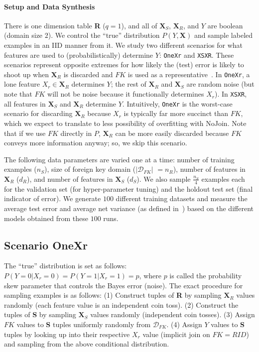 \documentclass{vldb}
\begin{document}
\paragraph*{Setup and Data Synthesis}
There is one dimension table \textbf{R} ($q=1$), and all of $\textbf{X}_S$, $\textbf{X}_R$, and $Y$ are boolean (domain size $2$).
We control the ``true'' distribution $P(Y,\textbf{X})$ and sample labeled examples in an IID manner from it.
We study two different scenarios for what features are used to (probabilistically) determine $Y$: \texttt{OneXr} and \texttt{XSXR}.
These scenarios represent opposite extremes for how likely the (test) error is likely to shoot up when $\textbf{X}_R$ is discarded
and $FK$ is used as a representative~\cite{hamlet}. In \texttt{OneXr}, a lone feature $X_r \in \textbf{X}_R$ determines $Y$; the 
rest of $\textbf{X}_R$ and $\textbf{X}_S$ are random noise (but note that $FK$ will not 
be noise because it functionally determines $X_r$). In \texttt{XSXR}, all features in $\textbf{X}_S$ and $\textbf{X}_R$ determine $Y$. 
Intuitively, \texttt{OneXr} is the worst-case scenario for discarding $\textbf{X}_R$ because $X_r$ is typically 
far more succinct than $FK$, which we expect to translate to less possibility of overfitting with NoJoin. Note that if we use $FK$ 
directly in $P$, $\textbf{X}_R$ can be more easily discarded because $FK$ conveys more information anyway; so, we skip this scenario.

The following data parameters are varied one at a time: number of training examples ($n_S$), size of foreign key domain ($|\mathcal{D}_{FK}|$ $=n_R$),
number of features in $\textbf{X}_R$ ($d_R$), and number of features in $\textbf{X}_S$ ($d_S$). We also sample $\frac{n_S}{4}$ examples each for the 
validation set (for hyper-parameter tuning) and the holdout test set (final indicator of error).
We generate $100$ different training datasets and measure the average test error and average net variance (as defined in~\cite{pedrobvd}) 
based on the different models obtained from these $100$ runs.

\subsection{Scenario OneXr}

The ``true'' distribution is set as follows: $P(Y=0|X_r=0)=P(Y=1|X_r=1)=p$, where $p$ is called the probability skew parameter that controls the Bayes error (noise).
The exact procedure for sampling examples is as follows: (1) Construct tuples of \textbf{R} by sampling $\textbf{X}_R$ values randomly (each feature value 
is an independent coin toss). (2) Construct the tuples of \textbf{S} by sampling $\textbf{X}_S$ values randomly (independent coin tosses). (3) Assign $FK$ 
values to \textbf{S} tuples uniformly randomly from $\mathcal{D}_{FK}$. (4) Assign $Y$ values to \textbf{S} tuples by looking up into their respective $X_r$ 
value (implicit join on $FK = RID$) and sampling from the above conditional distribution.
\end{document}
